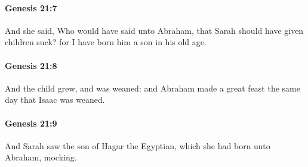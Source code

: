 		\paragraph{Genesis 21:7} %
			\label{GENESIS-21-7}

			And she said, Who would have said unto Abraham, that Sarah should have given children suck?  for I have born him a son in his old age.


		\paragraph{Genesis 21:8} %
			\label{GENESIS-21-8}

			And the child grew, and was weaned: and Abraham made a great feast the same day that Isaac was weaned.


		\paragraph{Genesis 21:9} %
			\label{GENESIS-21-9}

			And Sarah saw the son of Hagar the Egyptian, which she had born unto Abraham, mocking.



